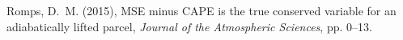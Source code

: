 \documentclass[draft,grl]{agutexSI}
\begin{document}
\begin{article}
%
 \begin{thebibliography}{}
Romps, D.~M. (2015), {MSE minus CAPE is the true conserved variable for an
  adiabatically lifted parcel}, \textit{Journal of the Atmospheric Sciences},
  pp. 0--13.
 \end{thebibliography}
%
%
%
%
%
%
%
%


%
%
%
%


\end{article}
\end{document}
